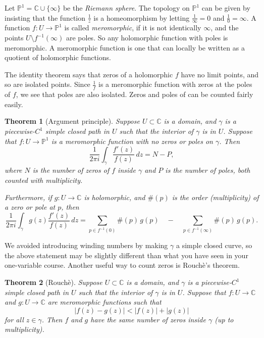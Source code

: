 \documentclass[12pt,openany]{book}
\newcommand{\sabs}[1]{\lvert {#1} \rvert}
\newcommand{\C}{{\mathbb{C}}}
\newcommand{\bP}{{\mathbb{P}}}
\newcommand{\myindex}[1]{#1\index{#1}}
\theoremstyle{plain}
\newtheorem{thm}{Theorem}[section]
\theoremstyle{remark}
\theoremstyle{definition}
\theoremstyle{exercise}
\theoremstyle{example}
\begin{document}
\pagebreak[2]

Let $\bP^1 = \C \cup \{\infty\}$ be the \emph{\myindex{Riemann sphere}}.
The topology on $\bP^1$ can be given by insisting that
the function $\frac{1}{z}$ is a homeomorphism
by letting $\frac{1}{\infty} = 0$ and $\frac{1}{0} = \infty$.
A function $f \colon U \to \bP^1$ is called \emph{\myindex{meromorphic}},
if it is not
identically $\infty$, and the points $U \setminus f^{-1}(\infty)$ are poles.
So any holomorphic function with poles is meromorphic.  A
meromorphic function is one that can locally be written as a quotient of
holomorphic functions.

The identity theorem says that zeros of a holomorphic $f$ have no limit
points, and so are isolated points.  Since $\frac{1}{f}$ is a meromorphic
function with zeros at the poles of $f$, we see that poles are also
isolated.  Zeros and poles of  can be counted fairly easily.

\begin{thm}[Argument principle]
Suppose $U \subset \C$ is a domain, and $\gamma$ is a piecewise-$C^1$
simple closed path in $U$ such that the interior of $\gamma$ is in $U$.
Suppose that $f \colon U \to \bP^1$ is a meromorphic function with no zeros
or poles on $\gamma$.
Then
\begin{equation*}
\frac{1}{2\pi i}
\int_\gamma \frac{f'(z)}{f(z)} \, dz
= N - P ,
\end{equation*}
where $N$ is the number of zeros of $f$ inside $\gamma$ and $P$ is the
number of poles, both counted with multiplicity.

Furthermore, if $g \colon U \to \C$ is holomorphic, and $\#(p)$ is the order
(multiplicity) of a zero or pole at $p$, then
\begin{equation*}
\frac{1}{2\pi i}
\int_\gamma g(z) \frac{f'(z)}{f(z)} \, dz
=
\sum_{p \in f^{-1}(0)}
\#(p) \, g(p)
\quad
-
\quad
\sum_{p \in f^{-1}(\infty)}
\#(p) \, g(p) .
\end{equation*}
\end{thm}

We avoided introducing winding numbers by making $\gamma$ a simple closed curve,
so the above statement may be slightly different than what you have seen in
your one-variable course.
Another useful way to count zeros is Rouch\`e's theorem.

\begin{thm}[Rouch\`e]
Suppose $U \subset \C$ is a domain, and $\gamma$ is a piecewise-$C^1$
simple closed path in $U$ such that the interior of $\gamma$ is in $U$.
Suppose that $f \colon U \to \C$ and $g \colon U \to \C$
are meromorphic functions such that
\begin{equation*}
\sabs{f(z)-g(z)} < \sabs{f(z)}+\sabs{g(z)}
\end{equation*}
for all $z \in \gamma$.  Then $f$ and $g$
have the same number of zeros
inside $\gamma$ (up to multiplicity).
\end{thm}
\end{document}
